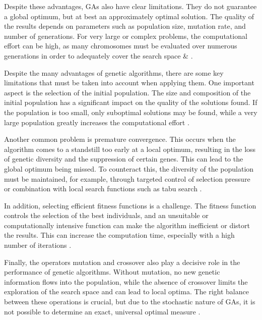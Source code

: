 \documentclass{agasthesis}
\begin{document}
Despite these advantages, GAs also have clear limitations. They do not guarantee a global optimum, but at best an approximately optimal solution. 
The quality of the results depends on parameters such as population size, mutation rate, and number of generations. For very large or complex problems, 
the computational effort can be high, as many chromosomes must be evaluated over numerous generations in order to adequately cover the search space \cite[p. 88]{melanie_introduction_1999} & \cite{osman_introduction_1995}.

Despite the many advantages of genetic algorithms, there are some key limitations that must be taken into account when applying them. 
One important aspect is the selection of the initial population. The size and composition of the initial population has a significant 
impact on the quality of the solutions found. If the population is too small, only suboptimal solutions may be found, while a very large 
population greatly increases the computational effort \cite[p. 8114–8116]{katoch_review_2021}.

Another common problem is premature convergence. This occurs when the algorithm comes to a standstill too early at a local optimum, 
resulting in the loss of genetic diversity and the suppression of certain genes. This can lead to the global optimum being missed. 
To counteract this, the diversity of the population must be maintained, for example, through targeted control of selection pressure 
or combination with local search functions such as tabu search \cite[p. 8114–8116]{katoch_review_2021}.

In addition, selecting efficient fitness functions is a challenge. The fitness function controls the selection of the best individuals, 
and an unsuitable or computationally intensive function can make the algorithm inefficient or distort the results. This can increase the computation time, 
especially with a high number of iterations \cite[p. 8114–8116]{katoch_review_2021}.

Finally, the operators mutation and crossover also play a decisive role in the performance of genetic algorithms. 
Without mutation, no new genetic information flows into the population, while the absence of crossover limits the exploration 
of the search space and can lead to local optima. The right balance between these operations is crucial, but due to the stochastic nature of GAs, 
it is not possible to determine an exact, universal optimal measure \cite[p. 8114–8116]{katoch_review_2021}.
\end{document}
